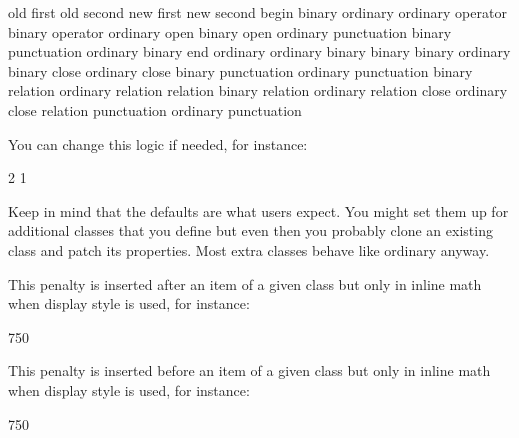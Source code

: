 \starttabulate[|c|c|c|c|]
\BC old first   \BC old second  \NC new first   \NC new second  \NC \NR
\ML
\NC begin       \NC binary      \NC ordinary    \NC ordinary    \NC \NR
\NC             \NC             \NC             \NC             \NC \NR
\NC operator    \NC binary      \NC operator    \NC ordinary    \NC \NR
\NC open        \NC binary      \NC open        \NC ordinary    \NC \NR
\NC punctuation \NC binary      \NC punctuation \NC ordinary    \NC \NR
\NC             \NC             \NC             \NC             \NC \NR
\NC binary      \NC end         \NC ordinary    \NC ordinary    \NC \NR
\NC binary      \NC binary      \NC binary      \NC ordinary    \NC \NR
\NC binary      \NC close       \NC ordinary    \NC close       \NC \NR
\NC binary      \NC punctuation \NC ordinary    \NC punctuation \NC \NR
\NC binary      \NC relation    \NC ordinary    \NC relation    \NC \NR
\NC             \NC             \NC             \NC             \NC \NR
\NC relation    \NC binary      \NC relation    \NC ordinary    \NC \NR
\NC relation    \NC close       \NC ordinary    \NC close       \NC \NR
\NC relation    \NC punctuation \NC ordinary    \NC punctuation \NC \NR
\stoptabulate

You can change this logic if needed, for instance:

\starttyping
{} 2  1
\stoptyping

Keep in mind that the defaults are what users expect. You might set them up for
additional classes that you define but even then you probably clone an existing
class and patch its properties. Most extra classes behave like ordinary anyway.

\stopnewprimitive

\startnewprimitive[title={\prm {setmathdisplaypostpenalty}}]

This penalty is inserted after an item of a given class but only in inline math
when display style is used, for instance:

\starttyping
{} 750
\stoptyping

\stopnewprimitive

\startnewprimitive[title={\prm {setmathdisplayprepenalty}}]

This penalty is inserted before an item of a given class but only in inline math
when display style is used, for instance:

\starttyping
{} 750
\stoptyping

\stopnewprimitive

